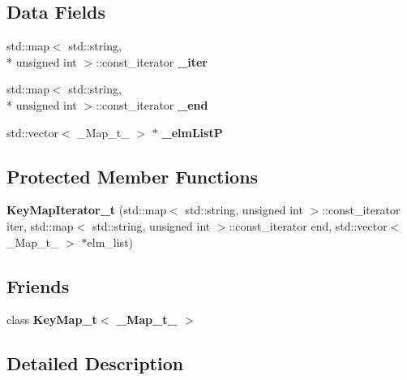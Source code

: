 \subsection*{Data Fields}
\begin{DoxyCompactItemize}
\item 
std\-::map$<$ std\-::string, \\*
unsigned int $>$\-::const\-\_\-iterator {\bfseries \-\_\-iter}\label{classhistmgr_1_1KeyMapIterator__t_aa41ef843e1366530672421aa495ba594}

\item 
std\-::map$<$ std\-::string, \\*
unsigned int $>$\-::const\-\_\-iterator {\bfseries \-\_\-end}\label{classhistmgr_1_1KeyMapIterator__t_a219ddf2712319da91557d603dc2e1a4d}

\item 
std\-::vector$<$ \-\_\-\-Map\-\_\-t\-\_\- $>$ $\ast$ {\bfseries \-\_\-elm\-List\-P}\label{classhistmgr_1_1KeyMapIterator__t_a7ab18ad834c26291af97185dd417d07a}

\end{DoxyCompactItemize}
\subsection*{Protected Member Functions}
\begin{DoxyCompactItemize}
\item 
{\bfseries Key\-Map\-Iterator\-\_\-t} (std\-::map$<$ std\-::string, unsigned int $>$\-::const\-\_\-iterator iter, std\-::map$<$ std\-::string, unsigned int $>$\-::const\-\_\-iterator end, std\-::vector$<$ \-\_\-\-Map\-\_\-t\-\_\- $>$ $\ast$elm\-\_\-list)\label{classhistmgr_1_1KeyMapIterator__t_a3612ff6f41ef33520d8bab59f38c4ed5}

\end{DoxyCompactItemize}
\subsection*{Friends}
\begin{DoxyCompactItemize}
\item 
class {\bfseries Key\-Map\-\_\-t$<$ \-\_\-\-Map\-\_\-t\-\_\- $>$}\label{classhistmgr_1_1KeyMapIterator__t_a191ea493c1085e4505ff75fc2371f4fc}

\end{DoxyCompactItemize}


\subsection{Detailed Description}
